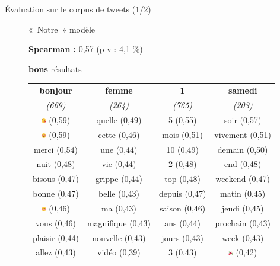 \documentclass[10pt,xcolor=table,color={dvipsnames,usenames},ignorenonframetext,usepdftitle=false,french]{beamer}
\begin{document}
\begin{frame}{Évaluation sur le corpus de tweets (1/2)}

\begin{figure}
\begin{minipage}{.4\textwidth}


« Notre » modèle

\medskip

\footnotesize
\textbf{ Spearman : } 0,57 (p-v : 4,1 \%)
\normalsize

\medskip

\faArrowCircleRight{} \textbf{bons} résultats


\end{minipage}%
\begin{minipage}{.6\textwidth}
\tiny

\begin{table}[!h]
\begin{center}
\begin{tabular}{|c|c|c|c|}
    \hline
\textbf{bonjour} & \textbf{femme} & \textbf{1} & \textbf{samedi} \tabularnewline
\emph{(669)} & \emph{(264)} & \emph{(765)} & \emph{(203)} \tabularnewline
       \hline
\includegraphics[height=2mm]{img/emojis/1.png} (0,59) & quelle (0,49) & 5 (0,55) & soir (0,57) \tabularnewline
\includegraphics[height=2mm]{img/emojis/2.png} (0,59) & cette (0,46) & mois (0,51) & vivement (0,51) \tabularnewline
merci (0,54) & une (0,44) & 10 (0,49) & demain (0,50) \tabularnewline
nuit (0,48) & vie (0,44) & 2 (0,48) & end (0,48) \tabularnewline
bisous (0,47) & grippe (0,44) & top (0,48) & weekend (0,47) \tabularnewline
bonne (0,47) & belle (0,43) & depuis (0,47) & matin (0,45) \tabularnewline
\includegraphics[height=2mm]{img/emojis/3.png} (0,46) & ma (0,43) & saison (0,46) & jeudi (0,45) \tabularnewline
vous (0,46) & magnifique (0,43) & ans (0,44) & prochain (0,43) \tabularnewline
plaisir (0,44) & nouvelle (0,43) & jours (0,43) & week (0,43) \tabularnewline
allez (0,43) & vidéo (0,39) & 3 (0,43) & \includegraphics[height=2mm]{img/emojis/4.png} (0,42) \tabularnewline
    \hline
 \end{tabular}
\captionsetup{margin=0cm,format=hang,justification=justified}


\end{center}
\end{table}
\end{minipage}
\end{figure}
\end{frame}
\end{document}
